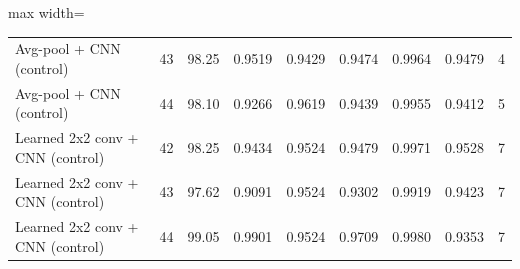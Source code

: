 \begin{table}[htbp]
\begin{adjustbox}{max width=\linewidth}
\begin{tabular}{lrrrrrrrr}
Avg-pool + CNN (control) & 43 & 98.25 & 0.9519 & 0.9429 & 0.9474 & 0.9964 & 0.9479 & 4 \\
Avg-pool + CNN (control) & 44 & 98.10 & 0.9266 & 0.9619 & 0.9439 & 0.9955 & 0.9412 & 5 \\
Learned 2x2 conv + CNN (control) & 42 & 98.25 & 0.9434 & 0.9524 & 0.9479 & 0.9971 & 0.9528 & 7 \\
Learned 2x2 conv + CNN (control) & 43 & 97.62 & 0.9091 & 0.9524 & 0.9302 & 0.9919 & 0.9423 & 7 \\
Learned 2x2 conv + CNN (control) & 44 & 99.05 & 0.9901 & 0.9524 & 0.9709 & 0.9980 & 0.9353 & 7 \\
\bottomrule
\end{tabular}
\end{adjustbox}
\end{table}
